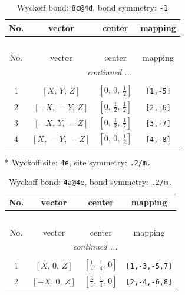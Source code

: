 \documentclass[fleqn,8pt]{jsarticle}
\begin{document}
\begin{longtable}{cccc}
\caption{Wyckoff bond: {\tt 8c@4d}, bond symmetry: {\tt -1}}
 \\
 \hline \hline
No. & vector & center & mapping \\ \hline \endfirsthead

\multicolumn{3}{l}{\tablename\ \thetable{}} \\
 \hline \hline
No. & vector & center & mapping \\ \hline \endhead

 \hline \hline
\multicolumn{3}{r}{\footnotesize\it continued ...} \\ \endfoot

 \hline \hline
\multicolumn{3}{r}{} \\ \endlastfoot

1 & $\left[ X,\, Y,\, Z \right]$ & $\left[ 0,\, 0,\, \frac{1}{2} \right]$ & {\tt [1,-5]} \\ \hline
2 & $\left[ - X,\, - Y,\, Z \right]$ & $\left[ 0,\, \frac{1}{2},\, \frac{1}{2} \right]$ & {\tt [2,-6]} \\ \hline
3 & $\left[ - X,\, Y,\, - Z \right]$ & $\left[ 0,\, \frac{1}{2},\, \frac{1}{2} \right]$ & {\tt [3,-7]} \\ \hline
4 & $\left[ X,\, - Y,\, - Z \right]$ & $\left[ 0,\, 0,\, \frac{1}{2} \right]$ & {\tt [4,-8]} \\
\end{longtable}
* Wyckoff site: {\tt 4e}, site symmetry: {\tt .2/m.}
\renewcommand{\arraystretch}{1.2}
\begin{longtable}{cccc}
\caption{Wyckoff bond: {\tt 4a@4e}, bond symmetry: {\tt .2/m.}}
 \\
 \hline \hline
No. & vector & center & mapping \\ \hline \endfirsthead

\multicolumn{3}{l}{\tablename\ \thetable{}} \\
 \hline \hline
No. & vector & center & mapping \\ \hline \endhead

 \hline \hline
\multicolumn{3}{r}{\footnotesize\it continued ...} \\ \endfoot

 \hline \hline
\multicolumn{3}{r}{} \\ \endlastfoot

1 & $\left[ X,\, 0,\, Z \right]$ & $\left[ \frac{1}{4},\, \frac{1}{4},\, 0 \right]$ & {\tt [1,-3,-5,7]} \\ \hline
2 & $\left[ - X,\, 0,\, Z \right]$ & $\left[ \frac{3}{4},\, \frac{1}{4},\, 0 \right]$ & {\tt [2,-4,-6,8]} \\
\end{longtable}
\end{document}

